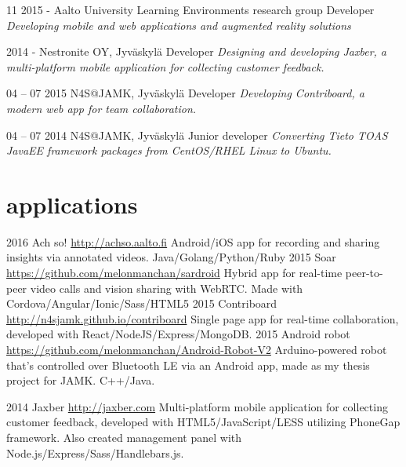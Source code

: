 \documentclass[]{friggeri-cv}
\begin{document}
\begin{entrylist}
  \entry
    {11 2015 - }
    {Aalto University Learning Environments research group}
    {Developer}
    {\emph{Developing mobile and web applications and augmented reality solutions}}

  \entry
    {2014 - }
    {Nestronite OY, Jyväskylä}
    {Developer}
    {\emph{Designing and developing Jaxber, a multi-platform mobile application for collecting customer feedback.}}
    
    \entry
    {04 – 07 2015}
    {N4S@JAMK, Jyväskylä}
    {Developer}
    {\emph{Developing Contriboard, a modern web app for team collaboration.}}
  
  \entry
    {04 – 07 2014}
    {N4S@JAMK, Jyväskylä}
    {Junior developer}
    {\emph{Converting Tieto TOAS JavaEE framework packages from CentOS/RHEL Linux to Ubuntu.}}
    
\end{entrylist}

\section{applications}

\begin{entrylist}
  \entry
    {2016}
    {Ach so!}
    {\href{http://achso.aalto.fi}{http://achso.aalto.fi}}
    {Android/iOS app for recording and sharing insights via annotated videos. Java/Golang/Python/Ruby}
  \entry
    {2015}
    {Soar}
    {\href{https://github.com/melonmanchan/sardroid}{https://github.com/melonmanchan/sardroid}}
    {Hybrid app for real-time peer-to-peer video calls and vision sharing with WebRTC. Made with Cordova/Angular/Ionic/Sass/HTML5}
  \entry
    {2015}
    {Contriboard}
    {\href{http://n4sjamk.github.io/contriboard/}{http://n4sjamk.github.io/contriboard}}
    {Single page app for real-time collaboration, developed with React/NodeJS/Express/MongoDB.}
  \entry
    {2015}
    {Android robot}
    {\href{https://github.com/melonmanchan/Android-Robot-V2}{https://github.com/melonmanchan/Android-Robot-V2}}
    {Arduino-powered robot that's controlled over Bluetooth LE via an Android app, made as my thesis project for JAMK. C++/Java.}

  \entry
    {2014}
    {Jaxber}
    {\href{http://jaxber.com}{http://jaxber.com}}
    {Multi-platform mobile application for collecting customer feedback, developed with HTML5/JavaScript/LESS utilizing PhoneGap framework. Also created management panel with Node.js/Express/Sass/Handlebars.js.}
\end{entrylist}
\end{document}
